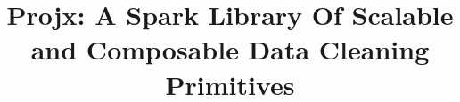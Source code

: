 \documentclass[english]{sig-alternate}
\begin{document}

\linespread{1}%

\title{Projx: A Spark Library Of Scalable and Composable Data Cleaning Primitives}


\iffalse
\author{\alignauthor Sanjay Krishnan,~~Jiannan Wang,~~Sameer Agarwal,~~Michael J. Franklin,~~Ken Goldberg \\
\vspace{.2em}\affaddr{AMPLab, UC Berkeley} \\
\fontsize{9}{10}\selectfont\ttfamily\upshape
\vspace{.1em}\{sanjay,jnwang\}@eecs.berkeley.edu, \{sameerag,franklin\}@cs.berkeley.edu, goldberg@berkeley.edu
}
\fi




\newtheorem{theorem}{Theorem}
\newtheorem{example}{Example}
\newtheorem{definition}{Definition}
\newtheorem{proposition}{Proposition}
\newtheorem{lemma}{Lemma}
\newtheorem{corollary}{Corollary}
\newtheorem{demonstration}{Demonstration}

\newcommand{\dataset}{data set\xspace}
\newcommand{\datasets}{data sets\xspace}
\newcommand{\biascorrected}{NormalizedSC\xspace}
\newcommand{\bias}{\biascorrected}
\newcommand{\sampledirty}{{SampleDirty}\xspace}
\newcommand{\sampleclean}{{RawSC}\xspace}
\newcommand{\allclean}{{AllClean}\xspace}
\newcommand{\alldirty}{{AllDirty}\xspace}
\newcommand{\projx}{\textsf{Projx}\xspace}
\newcommand{\saqp}{SAQP\xspace}
\newcommand{\saqpplus}{\projx}
\newcommand{\blinkdb}{BlinkDB\xspace}
\newcommand{\ctable}{\ensuremath{T^{clean}}\xspace}
\newcommand{\var}{\ensuremath{\texttt{var}}\xspace}
\end{document}
